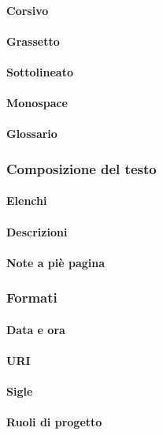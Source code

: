 \documentclass[../NormeProgetto.tex]{subfiles}
\begin{document}
			\paragraph{Corsivo}
			\paragraph{Grassetto}
			\paragraph{Sottolineato}
			\paragraph{Monospace}
			\paragraph{Glossario}
		\subsubsection{Composizione del testo}
			\paragraph{Elenchi}
			\paragraph{Descrizioni}
			\paragraph{Note a piè pagina}
		\subsubsection{Formati}
			\paragraph{Data e ora}
			\paragraph{URI}
			\paragraph{Sigle}
			\paragraph{Ruoli di progetto}
\end{document}
